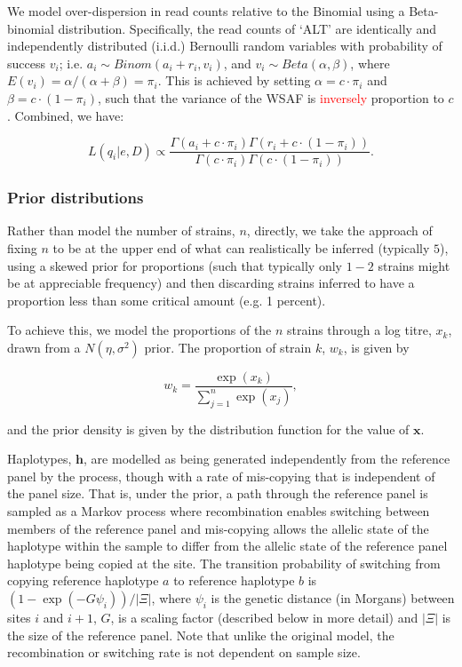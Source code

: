 \documentclass{bioinfo}
\begin{document}
\noindent We model over-dispersion in read counts relative to the Binomial using a Beta-binomial distribution. Specifically, the read counts of `ALT' are identically and independently distributed (i.i.d.) Bernoulli random variables with probability of success $v_i$; i.e. $a_i \sim Binom(a_i + r_i, v_i)$, and $v_i \sim Beta(\alpha, \beta)$, where $E(v_i) = \alpha/(\alpha+\beta) = \pi_{i}$. This is achieved by setting $\alpha = c\cdot \pi_{i} $ and $\beta = c\cdot (1-\pi_{i})$, such that the variance of the WSAF is \textcolor{red}{inversely}  proportion to $c$.  Combined, we have:

\begin{equation}
L(q_{i}| e, D) \propto \frac{\Gamma(a_i + c\cdot \pi_{i}) \Gamma(r_i + c\cdot (1-\pi_{i}))}{\Gamma(c\cdot \pi_{i})\Gamma(c\cdot (1-\pi_{i}))}. \label{eqn:llk}
\end{equation}


\subsubsection{Prior distributions}\label{sec:prior}

Rather than model the number of strains, $n$, directly, we take the approach of fixing $n$ to be at the upper end of what can realistically be inferred (typically $5$), using a skewed prior for proportions (such that typically only $1-2$ strains might be at appreciable frequency) and then discarding strains inferred to have a proportion less than some critical amount (e.g. 1 percent).

To achieve this, we model the proportions of the $n$ strains through a log titre, $x_k$, drawn from a $N(\eta, \sigma^2)$ prior.  The proportion of strain $k$, $w_k$, is given by

\begin{equation}
w_k = \frac{\exp(x_k)}{\sum_{j=1}^n \exp(x_j)},
\end{equation}

\noindent and the prior density is given by the distribution function for the value of $\mathbf{x}$.

Haplotypes, $\mathbf{h}$, are modelled as being generated independently from the reference panel by the \citet{Li2003} process, though with a rate of mis-copying that is independent of the panel size. That is, under the prior, a path through the reference panel is sampled as a Markov process where recombination enables switching between members of the reference panel and mis-copying allows the allelic state of the haplotype within the sample to differ from the allelic state of the reference panel haplotype being copied at the site.  The transition probability of switching from copying reference haplotype $a$ to reference haplotype $b$ is $(1-\exp(-G \psi_i))/|\Xi|$, where $\psi_i$ is the genetic distance (in Morgans) between sites $i$ and $i+1$, $G$, is a scaling factor (described below in more detail) and $|\Xi|$ is the size of the reference panel.  Note that unlike the original model, the recombination or switching rate is not dependent on sample size.
\end{document}
